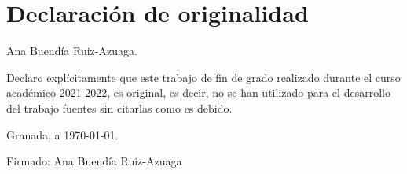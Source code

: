 

\chapter*{Declaración de originalidad}

Ana Buendía Ruiz-Azuaga.

Declaro explícitamente que este trabajo de fin de grado realizado durante el curso académico 2021-2022, es original, es decir, no se han utilizado para el desarrollo del trabajo fuentes sin citarlas como es debido.

Granada, a \today.

Firmado: Ana Buendía Ruiz-Azuaga

